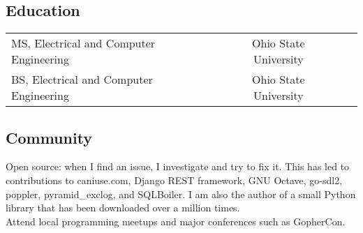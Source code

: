 \documentclass[12pt]{report}
\makeatletter
\renewcommand{\bullet}{$\vcenter{\hbox{~\huge$\cdot$~}}$}
\newenvironment{bullets}
{\tabularx{\textwidth}{ @{\bullet} X @{} }}
{\endtabularx}
\makeatother
\begin{document}
\subsection*{Education}
\begin{tabularx}{\textwidth}{ @{\bullet} l X c X r @{} }
MS, Electrical and Computer Engineering && Ohio State University \\
BS, Electrical and Computer Engineering && Ohio State University \\
\end{tabularx}

\subsection*{Community}
\begin{bullets}
Open source: when I find an issue, I investigate and try to fix it.
This has led to contributions to
	caniuse.com,
	Django REST framework,
	GNU Octave,
	go-sdl2,
	poppler,
	pyramid\_exclog,
	and
	SQLBoiler.
I am also the author of a small Python library that has been downloaded over a million times. \\
Attend local programming meetups and major conferences such as GopherCon. \\
\end{bullets}
\end{document}
